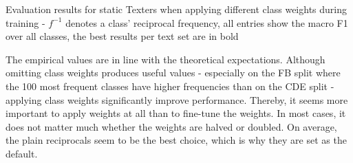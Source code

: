 \begin{table}[t]
    \centering
    
    \caption{Evaluation results for static Texters when applying different class weights during training - $f^{-1}$ denotes a class' reciprocal frequency, all entries show the macro F1 over all classes, the best results per text set are in bold}
    \label{tab:5_experiments/4_texter/2_static/7_weight_factor/grid_search}
\end{table}

The empirical values are in line with the theoretical expectations. Although omitting class weights produces useful values - especially on the FB split where the 100 most frequent classes have higher frequencies than on the CDE split - applying class weights significantly improve performance. Thereby, it seems more important to apply weights at all than to fine-tune the weights. In most cases, it does not matter much whether the weights are halved or doubled. On average, the plain reciprocals seem to be the best choice, which is why they are set as the default.
